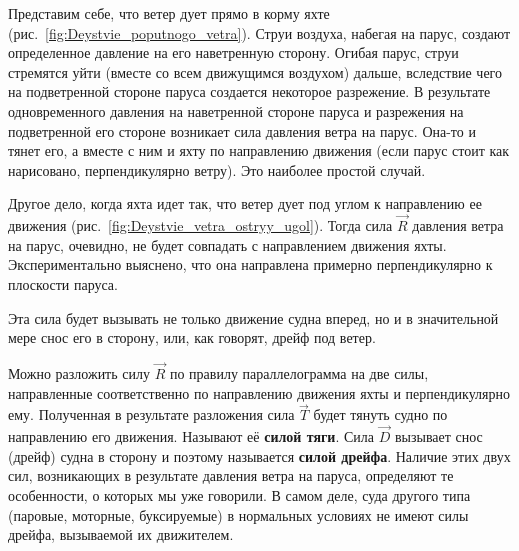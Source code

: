 \documentclass[a4paper, 12pt, twoside, final]{scrbook}
\begin{document}
Представим себе, что ветер дует прямо в корму яхте (рис.~\ref{fig:Deystvie_poputnogo_vetra}).
Струи воздуха, набегая на парус, создают определенное давление на
его наветренную сторону. Огибая парус, струи стремятся уйти (вместе
со всем движущимся воздухом) дальше, вследствие чего на подветренной
стороне паруса создается некоторое разрежение. В результате одновременного
давления на наветренной стороне паруса и разрежения на подветренной
его стороне возникает сила давления ветра на парус. Она-то и тянет
его, а вместе с ним и яхту по направлению движения (если парус стоит
как нарисовано, перпендикулярно ветру). Это наиболее простой случай.

Другое дело, когда яхта идет так, что ветер дует под углом к направлению
ее движения (рис.~\ref{fig:Deystvie_vetra_ostryy_ugol}).
Тогда сила $\overrightarrow{R}$ давления ветра на парус, очевидно, не будет
совпадать с направлением движения яхты. Экспериментально выяснено,
что она направлена примерно перпендикулярно к плоскости паруса.

Эта сила будет вызывать не только движение судна вперед, но и в значительной
мере снос его в сторону, или, как говорят, дрейф под ветер.

Можно разложить силу $\overrightarrow{R}$ по правилу параллелограмма на две силы,
направленные соответственно по направлению движения яхты и перпендикулярно
ему. Полученная в результате разложения сила $\overrightarrow{T}$ будет тянуть
судно по направлению его движения. Называют её \textbf{силой тяги}.
Сила $\overrightarrow{D}$ вызывает снос (дрейф) судна в сторону и поэтому называется
\textbf{силой дрейфа}. Наличие этих
двух сил, возникающих в результате давления ветра на паруса, определяют
те особенности, о которых мы уже говорили. В самом деле, суда другого
типа (паровые, моторные, буксируемые) в нормальных условиях не имеют
силы дрейфа, вызываемой их движителем.
\end{document}
